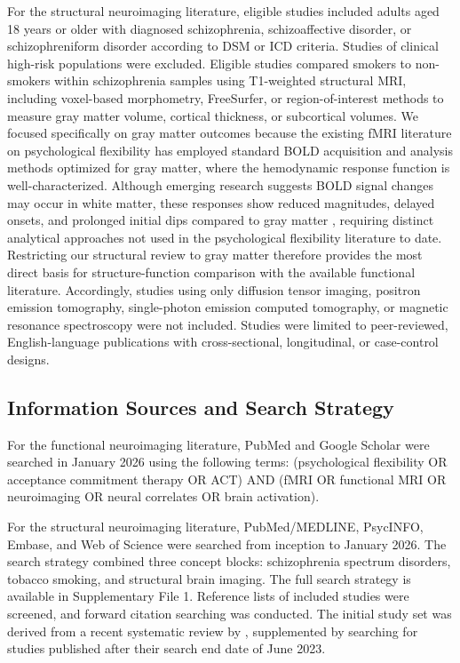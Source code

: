 \documentclass[12pt]{article}
\begin{document}
For the structural neuroimaging literature, eligible studies included adults aged 18 years or older with diagnosed schizophrenia, schizoaffective disorder, or schizophreniform disorder according to DSM or ICD criteria. Studies of clinical high-risk populations were excluded. Eligible studies compared smokers to non-smokers within schizophrenia samples using T1-weighted structural MRI, including voxel-based morphometry, FreeSurfer, or region-of-interest methods to measure gray matter volume, cortical thickness, or subcortical volumes. We focused specifically on gray matter outcomes because the existing fMRI literature on psychological flexibility has employed standard BOLD acquisition and analysis methods optimized for gray matter, where the hemodynamic response function is well-characterized. Although emerging research suggests BOLD signal changes may occur in white matter, these responses show reduced magnitudes, delayed onsets, and prolonged initial dips compared to gray matter \citep{grajauskas2019}, requiring distinct analytical approaches not used in the psychological flexibility literature to date. Restricting our structural review to gray matter therefore provides the most direct basis for structure-function comparison with the available functional literature. Accordingly, studies using only diffusion tensor imaging, positron emission tomography, single-photon emission computed tomography, or magnetic resonance spectroscopy were not included. Studies were limited to peer-reviewed, English-language publications with cross-sectional, longitudinal, or case-control designs.

\subsection{Information Sources and Search Strategy}

For the functional neuroimaging literature, PubMed and Google Scholar were searched in January 2026 using the following terms: (psychological flexibility OR acceptance commitment therapy OR ACT) AND (fMRI OR functional MRI OR neuroimaging OR neural correlates OR brain activation).

For the structural neuroimaging literature, PubMed/MEDLINE, PsycINFO, Embase, and Web of Science were searched from inception to January 2026. The search strategy combined three concept blocks: schizophrenia spectrum disorders, tobacco smoking, and structural brain imaging. The full search strategy is available in Supplementary File 1. Reference lists of included studies were screened, and forward citation searching was conducted. The initial study set was derived from a recent systematic review by \citet{koster2025}, supplemented by searching for studies published after their search end date of June 2023.
\end{document}
